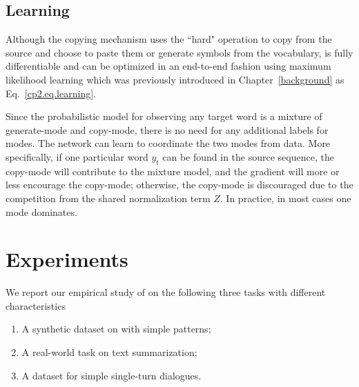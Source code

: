 \subsection{Learning} 	
Although the copying mechanism uses the ``hard" operation to copy from the source and choose to paste them or generate symbols from the vocabulary, \copynet is fully differentiable and can be optimized in an end-to-end fashion using maximum likelihood learning which was previously introduced in 	Chapter~\ref{background} as Eq.~\eqref{cp2.eq.learning}.

 Since the probabilistic model for observing any target word is a mixture of generate-mode and copy-mode, there is no need for any additional labels for modes. The network can learn to coordinate the two modes from data. More specifically, if one particular word $y_{t}$ can be found in the source sequence, the copy-mode will contribute to the mixture model, and the gradient will more or less encourage the copy-mode; otherwise, the copy-mode is discouraged due to the competition from the shared normalization term $Z$. In practice, in most cases one mode dominates.


\section{Experiments}
We report our empirical study of \copynet on the following three tasks with different characteristics
\begin{enumerate}
	\item A synthetic dataset on with simple patterns;
	\item A real-world task on text summarization;
	\item A dataset for simple single-turn dialogues.
\end{enumerate}  

